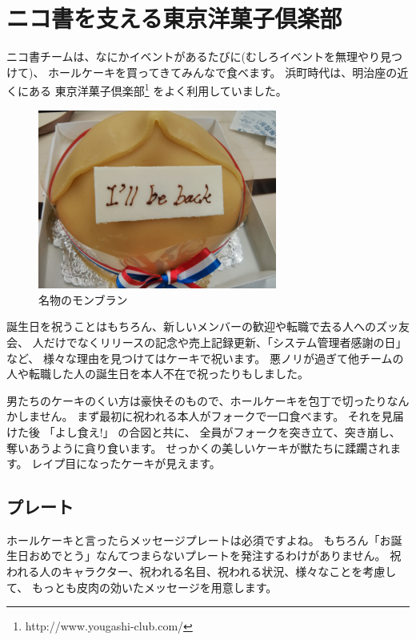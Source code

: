 \section{ニコ書を支える東京洋菓子倶楽部}

ニコ書チームは、なにかイベントがあるたびに(むしろイベントを無理やり見つけて)、
ホールケーキを買ってきてみんなで食べます。
浜町時代は、明治座の近くにある
東京洋菓子倶楽部\footnote{http://www.yougashi-club.com/}
をよく利用していました。

\begin{figure}[H]
\centering
\includegraphics[width=0.7\textwidth]{../images/tokyo_yogashi.jpg}
\caption{名物のモンブラン}
\end{figure}

誕生日を祝うことはもちろん、新しいメンバーの歓迎や転職で去る人へのズッ友会、
人だけでなくリリースの記念や売上記録更新、「システム管理者感謝の日」など、
様々な理由を見つけてはケーキで祝います。
悪ノリが過ぎて他チームの人や転職した人の誕生日を本人不在で祝ったりもしました。

男たちのケーキのくい方は豪快そのもので、ホールケーキを包丁で切ったりなんかしません。
まず最初に祝われる本人がフォークで一口食べます。 それを見届けた後
「よし食え!」 の合図と共に、
全員がフォークを突き立て、突き崩し、奪いあうように貪り食います。
せっかくの美しいケーキが獣たちに蹂躙されます。
レイプ目になったケーキが見えます。

\subsection{プレート}

ホールケーキと言ったらメッセージプレートは必須ですよね。
もちろん「お誕生日おめでとう」なんてつまらないプレートを発注するわけがありません。
祝われる人のキャラクター、祝われる名目、祝われる状況、様々なことを考慮して、
もっとも皮肉の効いたメッセージを用意します。

